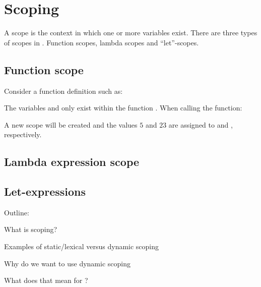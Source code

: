 \section{Scoping}
\label{sec:scoping}

A scope is the context in which one or more variables exist.
There are three types of scopes in \productname{}. Function scopes, lambda scopes and
``let''-scopes.

\subsection{Function scope}
Consider a function definition such as:


The variables  and  only exist within the function .
When calling the function:


A new scope will be created and the values $5$ and $23$
are assigned to  and , respectively.

\subsection{Lambda expression scope}

\subsection{Let-expressions}


Outline:

\begin{dlist}
\item What is scoping?
\item Examples of static/lexical versus dynamic scoping
\item Why do we want to use dynamic scoping
\item What does that mean for \productname?
\end{dlist}
